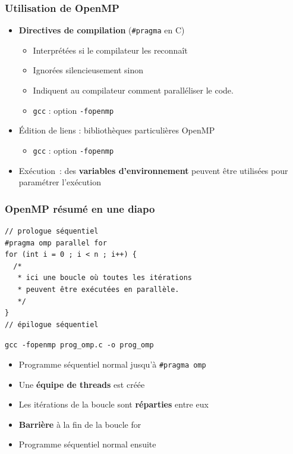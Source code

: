 \documentclass{beamer}
\begin{document}
\begin{frame}
  \frametitle{Utilisation de OpenMP}
  
\begin{itemize}
\item \textbf{Directives de compilation} ({\tt \#pragma} en C)
  \begin{itemize}
  \item Interprétées si le compilateur les reconnaît
  \item Ignorées \alert{silencieusement} sinon
  \item Indiquent au compilateur comment paralléliser le code.
  \item \texttt{gcc} : option \texttt{-fopenmp}
  \end{itemize}

\medskip
  
\item Édition de liens : bibliothèques particulières OpenMP
  \begin{itemize}
  \item \texttt{gcc} : option \texttt{-fopenmp}
  \end{itemize}

\medskip
  
\item Exécution~: des \textbf{variables d'environnement} peuvent être utilisées pour paramétrer
  l'exécution
\end{itemize}
\end{frame}


\begin{frame}[fragile]
  \frametitle{OpenMP résumé en une diapo}

  \begin{framed}
    \begin{verbatim}
// prologue séquentiel
#pragma omp parallel for
for (int i = 0 ; i < n ; i++) {
  /*
   * ici une boucle où toutes les itérations
   * peuvent être exécutées en parallèle.
   */
}
// épilogue séquentiel
\end{verbatim}
\end{framed}

\texttt{gcc \alert{-fopenmp} prog\_omp.c -o prog\_omp}

\medskip

\begin{itemize}
\item Programme séquentiel \og normal\fg{} jusqu'à \texttt{\#pragma omp}
\item Une \textbf{équipe de threads} est créée
\item Les itérations de la boucle sont \textbf{réparties} entre eux
\item \textbf{Barrière} à la fin de la boucle for
\item Programme séquentiel \og normal\fg{} ensuite
\end{itemize}

\end{frame}
\end{document}
